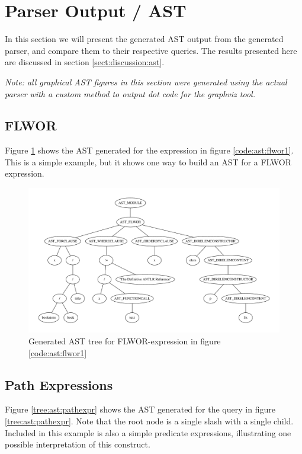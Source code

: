 \section{Parser Output / AST}
\label{sect:results:parser_output_ast}
In this section we will present the generated AST output from the generated
parser, and compare them to their respective queries. The results presented here
are discussed in section \ref{sect:discussion:ast}.

\emph{Note: all graphical AST figures in this section were generated using the
actual parser with a custom method to output dot code for the graphviz tool.}

\subsection{FLWOR}
Figure \ref{tree:ast:flwor1} shows the AST generated for the expression in
figure \ref{code:ast:flwor1}. This is a simple example, but it shows one way to
build an AST for a FLWOR expression.

\pagebreak
\begin{figure}[h!]

\caption{FLWOR expression example, generates AST seen in figure \ref{tree:ast:flwor1}}
\label{code:ast:flwor1}
\centering
 \includegraphics[width=1\textwidth]{img/graphs/flwor1}
\caption{Generated AST tree for FLWOR-expression in figure \ref{code:ast:flwor1}}
\label{tree:ast:flwor1}
\end{figure}

\subsection{Path Expressions}
Figure \ref{tree:ast:pathexpr} shows the AST generated for the query in figure
\ref{tree:ast:pathexpr}. Note that the root node is a single slash with a
single child. Included in this example is also a simple predicate expressions,
illustrating one possible interpretation of this construct.

